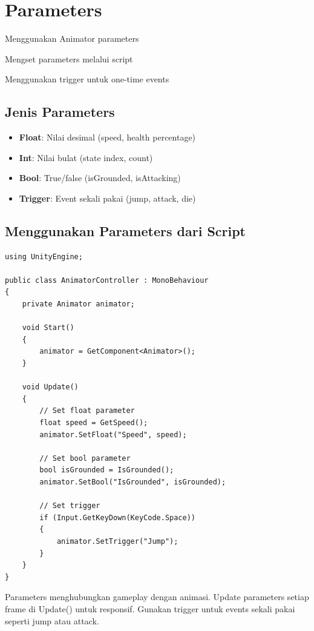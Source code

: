 
\section{Parameters}

\begin{learningoutcomes}
\item Menggunakan Animator parameters
\item Mengset parameters melalui script
\item Menggunakan trigger untuk one-time events
\end{learningoutcomes}

\subsection{Jenis Parameters}

\begin{itemize}
\item \textbf{Float}: Nilai desimal (speed, health percentage)
\item \textbf{Int}: Nilai bulat (state index, count)
\item \textbf{Bool}: True/false (isGrounded, isAttacking)
\item \textbf{Trigger}: Event sekali pakai (jump, attack, die)
\end{itemize}

\subsection{Menggunakan Parameters dari Script}

\begin{lstlisting}[language={[Sharp]C}]
using UnityEngine;

public class AnimatorController : MonoBehaviour
{
    private Animator animator;
    
    void Start()
    {
        animator = GetComponent<Animator>();
    }
    
    void Update()
    {
        // Set float parameter
        float speed = GetSpeed();
        animator.SetFloat("Speed", speed);
        
        // Set bool parameter
        bool isGrounded = IsGrounded();
        animator.SetBool("IsGrounded", isGrounded);
        
        // Set trigger
        if (Input.GetKeyDown(KeyCode.Space))
        {
            animator.SetTrigger("Jump");
        }
    }
}
\end{lstlisting}

\begin{catatan}
Parameters menghubungkan gameplay dengan animasi. Update parameters setiap frame di Update() untuk responsif. Gunakan trigger untuk events sekali pakai seperti jump atau attack.
\end{catatan}
